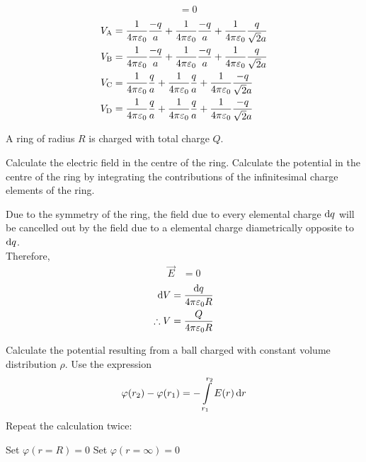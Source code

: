 \documentclass[fleqn, a4paper, 12pt, twoside]{article}
\theoremstyle{definition}
\theoremstyle{theorem}
\begin{document}
\begin{solution}
\begin{tasks}
\begin{align*}
				&= 0
			\end{align*}
		\task
			\begin{align*}
				V_{\textnormal{A}} &= \dfrac{1}{4 \pi \varepsilon_0} \dfrac{-q}{a} + \dfrac{1}{4 \pi \varepsilon_0} \dfrac{-q}{a} + \dfrac{1}{4 \pi \varepsilon_0} \dfrac{q}{\sqrt{2} a}\\
				V_{\textnormal{B}} &= \dfrac{1}{4 \pi \varepsilon_0} \dfrac{-q}{a} + \dfrac{1}{4 \pi \varepsilon_0} \dfrac{-q}{a} + \dfrac{1}{4 \pi \varepsilon_0} \dfrac{q}{\sqrt{2} a}\\
				V_{\textnormal{C}} &= \dfrac{1}{4 \pi \varepsilon_0} \dfrac{q}{a} + \dfrac{1}{4 \pi \varepsilon_0} \dfrac{q}{a} + \dfrac{1}{4 \pi \varepsilon_0} \dfrac{-q}{\sqrt{2} a}\\
				V_{\textnormal{D}} &= \dfrac{1}{4 \pi \varepsilon_0} \dfrac{q}{a} + \dfrac{1}{4 \pi \varepsilon_0} \dfrac{q}{a} + \dfrac{1}{4 \pi \varepsilon_0} \dfrac{-q}{\sqrt{2} a}
			\end{align*}
	\end{tasks}
\end{solution}

\begin{question}
	A ring of radius $R$ is charged with total charge $Q$.
	\begin{tasks}
		\task Calculate the electric field in the centre of the ring.
		\task Calculate the potential in the centre of the ring by integrating the contributions of the infinitesimal charge elements of the ring.
	\end{tasks}
\end{question}

\begin{solution}
	\begin{tasks}
		\task
			Due to the symmetry of the ring, the field due to every elemental charge $\dif q$ will be cancelled out by the field due to a elemental charge diametrically opposite to $\dif q$.\\
			Therefore, 
			\begin{align*}
				\overrightarrow{E} &= 0
			\end{align*}
		\task
			\begin{align*}
				\dif V &= \dfrac{\dif q}{4 \pi \varepsilon_0 R}\\
				\therefore V &= \dfrac{Q}{4 \pi \varepsilon_0 R}
			\end{align*}
	\end{tasks}
\end{solution}

\begin{question}
	Calculate the potential resulting from a ball charged with constant volume distribution $\rho$. Use the expression
	\begin{equation*}
		\varphi(r_2) - \varphi(r_1) = - \int\limits_{r_1}^{r_2} E(r) \dif r
	\end{equation*}
	Repeat the calculation twice:
	\begin{tasks}
		\task Set $\varphi(r = R) = 0$
		\task Set $\varphi(r = \infty) = 0$
	\end{tasks}
\end{question}
\end{document}
